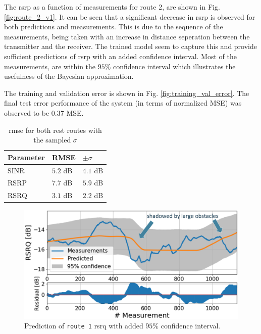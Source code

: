 The \gls{rsrp} as a function of measurements for route 2, are shown in Fig. \ref{fig:route_2_v1}. It can be seen that a significant decrease in \gls{rsrp} is observed for both predictions and measurements. This is due to the sequence of the measurements, being taken with an increase in distance seperation between the transmitter and the receiver. The trained model seem to capture this and provide sufficient predictions of \gls{rsrp} with an added confidence interval. Most of the measurements, are within the $95\%$ confidence interval which illustrates the usefulness of the Bayesian approximation. 

The training and validation error is shown in Fig. \ref{fig:training_val_error}. The final test error performance of the system (in terms of normalized MSE) was observed to be $\mathbf{0.37}$ MSE. 

\def\arraystretch{1.5}
\begin{table}[]
\centering
\begin{tabular}{@{}lll@{}}
\toprule
\textbf{Parameter} & RMSE   & $\pm \sigma$ \\ \midrule
SINR               & $5.2$ dB & $4.1$ dB       \\
RSRP               & $7.7$ dB & $5.9$ dB       \\
RSRQ               & $3.1$ dB & $2.2$ dB       \\ \bottomrule
\end{tabular}
\caption{\gls{rmse} for both rest routes with the sampled $\sigma$ }\label{tab:rmse_error_v1}
\end{table}



\begin{figure}
    \centering
    \includegraphics{chapters/part_pathloss/drive_test_minimzation_paper/route_1_predictions_5ab708662d60543b24f857a1_annotated.eps}
    \caption{Prediction of \texttt{route 1} \gls{rsrq} with added $95\%$ confidence interval.}
    \label{fig:route_1_v1}
\end{figure}


